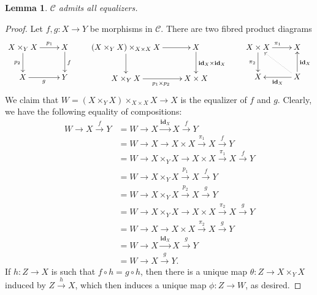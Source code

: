 \documentclass[10pt]{article}
\theoremstyle{thmstyle}
\newtheorem{lemma}[theorem]{Lemma}
\theoremstyle{defstyle}
\newcommand{\id}{\mathbf{id}}
\newcommand{\scrC}{\mathscr{C}} %
\begin{document}
\begin{lemma}
    $\scrC$ admits all equalizers.
\end{lemma}
\begin{proof}
    Let $f, g: X\to Y$ be morphisms in $\scrC$. There are two fibred product diagrams 
    \begin{equation*}
        \xymatrix {
            X\times_Y X\ar[r]^-{p_1}\ar[d]_{p_2} & X\ar[d]^f\\
            X\ar[r]_g & Y
        }
        \qquad 
        \xymatrix {
            \left(X\times_Y X\right)\times_{X\times X} X\ar[r]\ar[d] & X\ar[d]^{\id_X\times\id_X}\\
            X\times_Y X\ar[r]_{p_1\times p_2} & X\times X
        }
        \qquad 
        \xymatrix {
            X\times X\ar[r]^{\pi_1}\ar[d]_{\pi_2} & X\\
            X & \ar[l]^{\id_X}X\ar[u]_{\id_X}\ar@{.>}[lu]
        }
    \end{equation*}
    We claim that $W = \left(X\times_Y X\right)\times_{X\times X} X\to X$ is the equalizer of $f$ and $g$. Clearly, we have the following equality of compositions: 
    \begin{align*}
        W\to X\xrightarrow{f} Y &= W\to X\xrightarrow{\id_X} X\xrightarrow{f} Y\\
        &= W\to X\to X\times X\xrightarrow{\pi_1} X\xrightarrow{f} Y\\
        &= W\to X\times_Y X\to X\times X\xrightarrow{\pi_1} X\xrightarrow{f} Y\\
        &= W\to X\times_Y X\xrightarrow{p_1} X\xrightarrow{f} Y\\
        &= W\to X\times_Y X\xrightarrow{p_2} X\xrightarrow{g} Y\\
        &= W\to X\times_Y X\to X\times X\xrightarrow{\pi_2} X\xrightarrow{g} Y\\
        &= W\to X\to X\times X\xrightarrow{\pi_2} X\xrightarrow{g} Y\\
        &= W\to X\xrightarrow{\id_X} X\xrightarrow{g} Y\\
        &= W\to X\xrightarrow{g} Y.
    \end{align*}
    If $h: Z\to X$ is such that $f\circ h = g\circ h$, then there is a unique map $\theta: Z\to X\times_Y X$ induced by $Z\xrightarrow{h} X$, which then induces a unique map $\phi: Z\to W$, as desired.
\end{proof}
\end{document}
